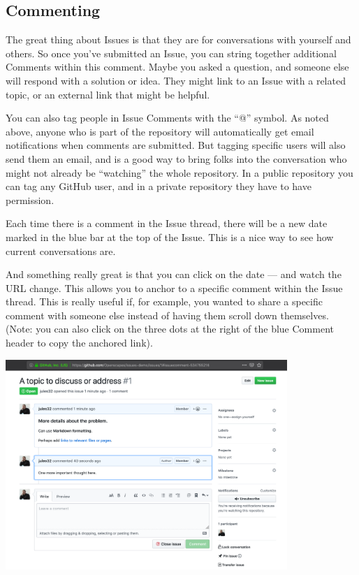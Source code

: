 \documentclass[
  letterpaper,
  DIV=11,
  numbers=noendperiod]{scrreprt}
\begin{document}
\hypertarget{commenting}{%
\subsection{Commenting}\label{commenting}}

The great thing about Issues is that they are for conversations with
yourself and others. So once you've submitted an Issue, you can string
together additional Comments within this comment. Maybe you asked a
question, and someone else will respond with a solution or idea. They
might link to an Issue with a related topic, or an external link that
might be helpful.

You can also tag people in Issue Comments with the ``@'' symbol. As
noted above, anyone who is part of the repository will automatically get
email notifications when comments are submitted. But tagging specific
users will also send them an email, and is a good way to bring folks
into the conversation who might not already be ``watching'' the whole
repository. In a public repository you can tag any GitHub user, and in a
private repository they have to have permission.

Each time there is a comment in the Issue thread, there will be a new
date marked in the blue bar at the top of the Issue. This is a nice way
to see how current conversations are.

And something really great is that you can click on the date --- and
watch the URL change. This allows you to anchor to a specific comment
within the Issue thread. This is really useful if, for example, you
wanted to share a specific comment with someone else instead of having
them scroll down themselves. (Note: you can also click on the three dots
at the right of the blue Comment header to copy the anchored link).

\includegraphics[width=0.8\textwidth,height=\textheight]{./img/issues-comment.png}
\end{document}

